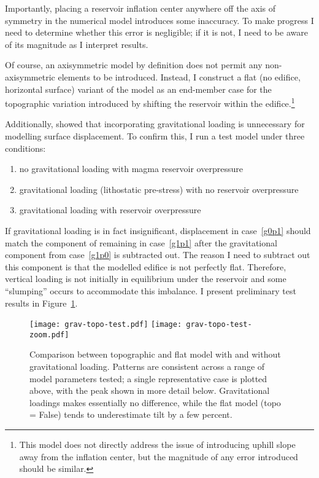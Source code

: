 Importantly, placing a reservoir inflation center anywhere off the axis of symmetry in the numerical model introduces some inaccuracy. To make progress I need to determine whether this error is negligible; if it is not, I need to be aware of its magnitude as I interpret results.

Of course, an axisymmetric model by definition does not permit any non-axisymmetric elements to be introduced. Instead, I construct a flat (no edifice, horizontal surface) variant of the model as an end-member case for the topographic variation introduced by shifting the reservoir within the edifice.\footnote{This model does not directly address the issue of introducing uphill slope away from the inflation center, but the magnitude of any error introduced should be similar.}

Additionally, \textcite{grosfils_magma_2007} showed that incorporating gravitational loading is unnecessary for modelling surface displacement. To confirm this, I run a test model under three conditions:
\begin{enumerate}
    \item no gravitational loading with magma reservoir overpressure \label{g0p1}
    \item gravitational loading (lithostatic pre-stress) with no reservoir overpressure\label{g1p0}
    \item gravitational loading with reservoir overpressure \label{g1p1}
\end{enumerate}
If gravitational loading is in fact insignificant, displacement in case~\ref{g0p1} should match the component of remaining in case~\ref{g1p1} after the gravitational component from case~\ref{g1p0} is subtracted out. The reason I need to subtract out this component is that the modelled edifice is not perfectly flat. Therefore, vertical loading is not initially in equilibrium under the reservoir and some ``slumping'' occurs to accommodate this imbalance. I present preliminary test results in Figure~\ref{fig:grav-topo-test}.

\begin{figure}
    \texttt{[image: grav-topo-test.pdf]}
    \texttt{[image: grav-topo-test-zoom.pdf]}%
    \caption[Numerical model sensitivity to topography and gravity]{Comparison between topographic and flat model with and without gravitational loading. Patterns are consistent across a range of model parameters tested; a single representative case is plotted above, with the peak shown in more detail below. Gravitational loadings makes essentially no difference, while the flat model (topo = False) tends to underestimate tilt by a few percent.}%
    \label{fig:grav-topo-test}%
\end{figure}

